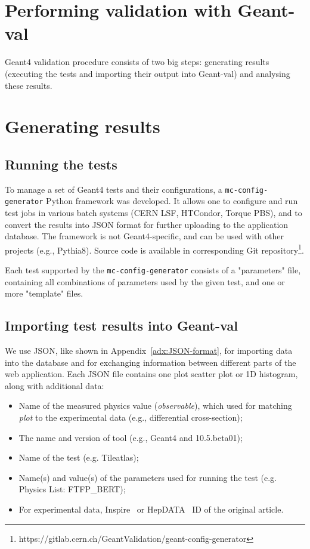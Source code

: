 \section{Performing validation with Geant-val}
\label{sec-workflow}

Geant4 validation procedure consists of two big steps: generating results (executing the tests and importing their output into Geant-val) and analysing these results.

\section{Generating results}

\subsection{Running the tests}

To manage a set of Geant4 tests and their configurations, a {\tt mc-config-generator} Python framework was developed. It allows one to configure and run test jobs in various batch systems (CERN LSF, HTCondor, Torque PBS), and to convert the results into  JSON format for further uploading to the application database. The framework is not Geant4-specific, and can be used with other projects (e.g., Pythia8). Source code is available in corresponding Git repository\footnote{https://gitlab.cern.ch/GeantValidation/geant-config-generator}.

Each test supported by the {\tt mc-config-generator} consists of a "parameters" file, containing all combinations of parameters used by the given test, and one or more "template" files.

\subsection{Importing test results into Geant-val}

We use JSON, like shown in Appendix~\ref{adx:JSON-format}, for importing data into the database and for exchanging information between different parts of the web application. Each JSON file contains one plot scatter plot or 1D histogram, along with additional data:

\begin{itemize}
    \item Name of the measured physics value (\textit{observable}), which used for matching \textit{plot} to the experimental data (e.g., differential cross-section);
    \item The name and version of tool (e.g., Geant4 and 10.5.beta01);
    \item Name of the test (e.g. Tileatlas);
    \item Name(s) and value(s) of the parameters used for running the test (e.g. Physics List: FTFP\_BERT);
    \item For experimental data, Inspire~\cite{inspire} or HepDATA~\cite{hepdata} ID of the original article.
\end{itemize}

